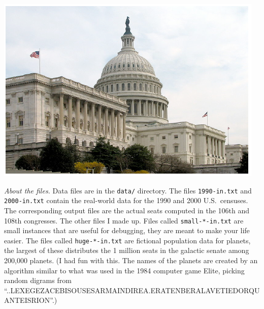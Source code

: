 \documentclass[9pt]{memoir}
\begin{document}
\begin{multicols}{2}

\noindent
\includegraphics[width=\columnwidth]{congressphoto.pdf}



\end{multicols}

\noindent
\emph{About the files.}
Data files are in the \texttt{data/} directory.
The files \texttt{1990-in.txt} and \texttt{2000-in.txt} contain the real-world data
for the 1990 and 2000 U.S.\ censuses.
The corresponding output files are the actual seats computed in the
106th and 108th congresses.
The other files I made up.
Files called \texttt{small-*-in.txt} are small instances that are useful for
debugging, they are meant to make your life easier.
The files called \texttt{huge-*-in.txt} are fictional population data for
planets, the largest of these distributes the 1 million seats in the
galactic senate among 200,000 planets.
(I had fun with this.
The names of the planets are created by an algorithm similar to what
was used in the 1984 computer game Elite, picking random digrams from
``..LEXEGEZACEBISOUSESARMAINDIREA.ERATENBERALAVETIEDORQUANTEISRION''.)
\end{document}
